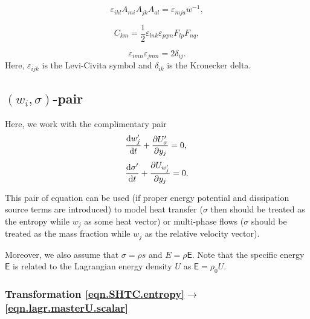 \documentclass[twoside]{article}
\newcommand{\ted}{E} %
\newcommand{\tes}{\mathsf{E}} %
\newcommand{\pd}{\partial}
\newcommand{\rmd}{{\rm d}}
\begin{document}
\begin{equation}\label{eq.DetLeviCivita}
\varepsilon _{{ikl}}A_{{mi}}A_{{jk}}A_{{al}}=\varepsilon_{mja}w^{-1},
\end{equation}

\begin{equation}\label{eq.CofFormulaLeviCivita}
C_{{km}}=\frac{1}{2}\varepsilon _{{lnk}}\varepsilon _{{pqm}}F_{{lp}} F_{{nq}},
\end{equation}

\begin{equation}\label{eq.LeviCivitaKronecker}
\varepsilon _{{imn}}\varepsilon _{{jmn}}=2\delta _{{ij}}.
\end{equation}
Here, $ \varepsilon_{ijk} $ is the Levi-Civita symbol and $ \delta_{ik} $ is 
the 
Kronecker delta.

\subsection{$ (w_i,\sigma) $-pair}
Here, we work with the complimentary pair
\begin{subequations}
	\begin{align*}
	& \frac{\rmd w'_j}{{\rm d} t} + \frac{\pd U_\sigma'}{\pd y_j} = 0,\\[1mm]
	& \frac{\rmd \sigma'}{{\rm d} t} + \frac{\pd U_{w'_j}}{\pd y_j} = 0.\\[1mm]
	\end{align*}
\end{subequations}
This pair of equation can be used (if proper energy potential and dissipation 
source terms are 
introduced) to model heat transfer ($ \sigma $ 
then should be treated as the entropy while $ w_j $ as some heat vector) or 
multi-phase flows ($ \sigma $ should be treated as the mass fraction while $ 
w_j $ 
as the relative velocity vector).





Moreover, we also assume that $ \sigma = 
\rho s $ and $ \ted = \rho \tes $. Note that the specific energy $ \tes $ is
related to the Lagrangian energy density $ U $ as $ \tes = \rho_0 U $.

\subsubsection{Transformation \eqref{eqn.SHTC.entropy}$ \rightarrow 
$\eqref{eqn.lagr.masterU.scalar}}
\end{document}
